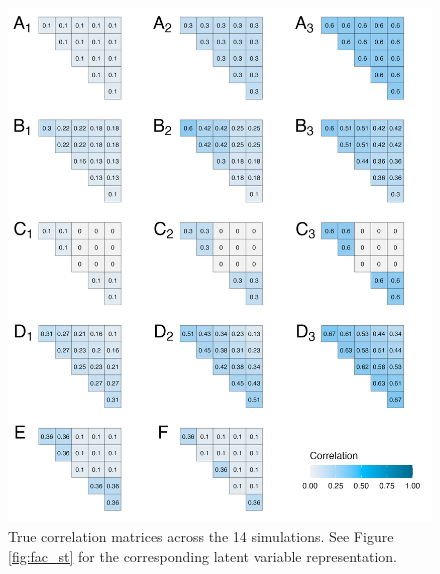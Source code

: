 \documentclass[man, 12pt]{apa7} %
\begin{document}
\begin{figure}[htbp]
    \centering  %
    \includegraphics[width=\linewidth, height=1.1\linewidth, keepaspectratio]{_figs/true_cors.png}
    \caption{True correlation matrices across the 14 simulations.  See Figure \ref{fig:fac_st} for the corresponding latent variable representation.} 
    \label{fig:true_cors}
\end{figure}
\end{document}
